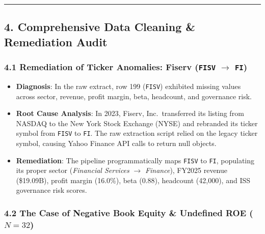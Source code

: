 \documentclass[
]{article}
\providecommand{\tightlist}{%
  \setlength{\itemsep}{0pt}\setlength{\parskip}{0pt}}
\begin{document}
\begin{center}\rule{0.5\linewidth}{0.5pt}\end{center}

\subsection{4. Comprehensive Data Cleaning \& Remediation
Audit}\label{comprehensive-data-cleaning-remediation-audit}

\subsubsection{\texorpdfstring{4.1 Remediation of Ticker Anomalies:
Fiserv (\texttt{FISV} \(\rightarrow\)
\texttt{FI})}{4.1 Remediation of Ticker Anomalies: Fiserv (FISV \textbackslash rightarrow FI)}}\label{remediation-of-ticker-anomalies-fiserv-fisv-rightarrow-fi}

\begin{itemize}
\tightlist
\item
  \textbf{Diagnosis}: In the raw extract, row 199 (\texttt{FISV})
  exhibited missing values across sector, revenue, profit margin, beta,
  headcount, and governance risk.
\item
  \textbf{Root Cause Analysis}: In 2023, Fiserv, Inc.~transferred its
  listing from NASDAQ to the New York Stock Exchange (NYSE) and
  rebranded its ticker symbol from \texttt{FISV} to \texttt{FI}. The raw
  extraction script relied on the legacy ticker symbol, causing Yahoo
  Finance API calls to return null objects.
\item
  \textbf{Remediation}: The pipeline programmatically maps \texttt{FISV}
  to \texttt{FI}, populating its proper sector (\emph{Financial
  Services} \(\rightarrow\) \emph{Finance}), FY2025 revenue (\$19.09B),
  profit margin (16.0\%), beta (0.88), headcount (42,000), and ISS
  governance risk scores.
\end{itemize}

\subsubsection{\texorpdfstring{4.2 The Case of Negative Book Equity \&
Undefined ROE
(\(N = 32\))}{4.2 The Case of Negative Book Equity \& Undefined ROE (N = 32)}}\label{the-case-of-negative-book-equity-undefined-roe-n-32}
\end{document}
